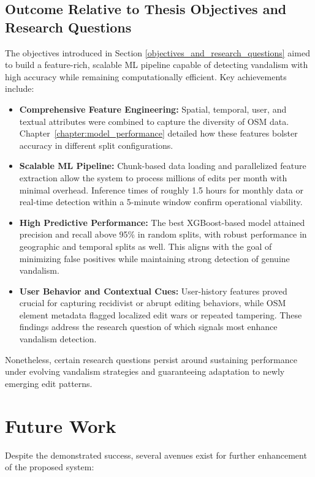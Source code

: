 \documentclass[
    13pt, %
    a4paper, %
    listof=totoc, %
    bibliography=totoc, %
    index=totoc, %
    headsepline
]{scrreprt}
\begin{document}
\subsection{Outcome Relative to Thesis Objectives and Research Questions}
The objectives introduced in Section \ref{objectives_and_research_questions} aimed to build a feature-rich, scalable ML pipeline capable of detecting vandalism with high accuracy while remaining computationally efficient. Key achievements include:
\begin{itemize}
    \item \textbf{Comprehensive Feature Engineering:} Spatial, temporal, user, and textual attributes were combined to capture the diversity of OSM data. Chapter~\ref{chapter:model_performance} detailed how these features bolster accuracy in different split configurations.
    \item \textbf{Scalable ML Pipeline:} Chunk-based data loading and parallelized feature extraction allow the system to process millions of edits per month with minimal overhead. Inference times of roughly 1.5 hours for monthly data or real-time detection within a 5-minute window confirm operational viability.
    \item \textbf{High Predictive Performance:} The best XGBoost-based model attained precision and recall above 95\% in random splits, with robust performance in geographic and temporal splits as well. This aligns with the goal of minimizing false positives while maintaining strong detection of genuine vandalism.
    \item \textbf{User Behavior and Contextual Cues:} User-history features proved crucial for capturing recidivist or abrupt editing behaviors, while OSM element metadata flagged localized edit wars or repeated tampering. These findings address the research question of which signals most enhance vandalism detection.
\end{itemize}
Nonetheless, certain research questions persist around sustaining performance under evolving vandalism strategies and guaranteeing adaptation to newly emerging edit patterns.

\section{Future Work}
\label{sec:future_work}

Despite the demonstrated success, several avenues exist for further enhancement of the proposed system:
\end{document}
